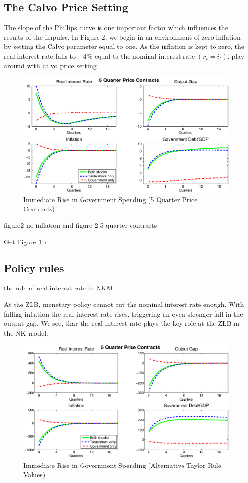 \documentclass[12pt,a4paper,oneside,titlepage]{article}
\begin{document}
\subsection*{The Calvo Price Setting}
The slope of the Phillips curve is one important factor which influences the results of the impulse. In Figure 2, we begin in an environment of zero inflation by setting the Calvo parameter equal to one.
As the inflation is kept to zero, the real interest rate falls to $-4\%$ equal to the nominal interest rate $\left(r_t = i_t\right)$.
play around with calvo price setting
\begin{figure}[p]
\includegraphics[width=\textwidth]{Paperpics/Figure25quarter}
\caption{Immediate Rise in Government Spending (5 Quarter Price Contracts)}
\label{IR5quarter}
\end{figure}

figure2 no inflation and figure 2 5 quarter contracts

Get Figure 1b

\subsection*{Policy rules}
the role of real interest rate in NKM

At the ZLB, monetary policy cannot cut the nominal interest rate enough. With falling inflation the real interest rate rises, triggering an even stronger fall in the output gap. We see, thar the real interest rate plays the key role at the ZLB in the NK model.

\begin{figure}[p]
\includegraphics[width=\textwidth]{Paperpics/Figure25quarternewtaylorrule}
\caption{Immediate Rise in Government Spending (Alternative Taylor Rule Values)}
\label{IR5quarternewtr}
\end{figure}
\bigskip
\end{document}
